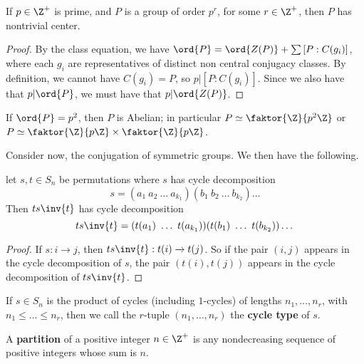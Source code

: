 \begin{theorem}\label{4.3.3}
    If $p \in \Z^+$ is prime, and $P$ is a group of order $p^r$, for some  $r
    \in \Z^+$, then $P$ has nontrivial center.
\end{theorem}
\begin{proof}
    By the class equation, we have $\ord{P}=\ord{Z(P)}+\sum{[P:C(g_i)]}$, where
    each $g_i$ are representatives of distinct non central conjugacy classes. By
    definition, we cannot have $C(g_i)=P$, so $p|[P:C(g_i)]$. Since we also have
    that $p|\ord{P}$, we must have that $p|\ord{Z(P)}$.
\end{proof}
\begin{corollary}
    If $\ord{P}=p^2$, then $P$ is Abelian; in particular  $P \simeq
    \faktor{\Z}{p^2\Z}$ or $P \simeq \faktor{\Z}{p\Z} \times \faktor{\Z}{p\Z}$.
\end{corollary}

Consider now, the conjugation of symmetric groups. We then have the following.

\begin{lemma}\label{4.3.4}
    let $s,t \in S_n$ be permutations where $s$ has cycle decomposition
    \begin{equation*}
        s=(a_1 \ a_2 \ \dots \ a_{k_1})(b_1 \ b_2 \ \dots \ b_{k_2})\dots
    \end{equation*}
    Then $ts\inv{t}$ has cycle decomposition
    \begin{equation*}
        ts\inv{t}=(t(a_1) \ \dots \ t(a_{k_1}))(t(b_1) \ \dots \ t(b_{k_2}))\dots
    \end{equation*}
\end{lemma}
\begin{proof}
    If $s:i \xrightarrow{} j$, then $ts\inv{t}:t(i) \xrightarrow{} t(j)$. So if
    the pair $(i,j)$ appears in the cycle decomposition of $s$, the pair
    $(t(i),t(j))$ appears in the cycle decomposition of $ts\inv{t}$.
\end{proof}

\begin{definition}
    If $s \in S_n$ is the product of cycles (including $1$-cycles) of lengths
    $n_1, \dots, n_r$, with $n_1 \leq \dots \leq n_r$, then we call the $r$-tuple
    $(n_1, \dots, n_r)$ the \textbf{cycle type} of $s$.
\end{definition}

\begin{definition}
    A \textbf{partition} of a positive integer $n \in \Z^+$ is any nondecreasing
    sequence of positive integers whose sum is $n$.
\end{definition}

